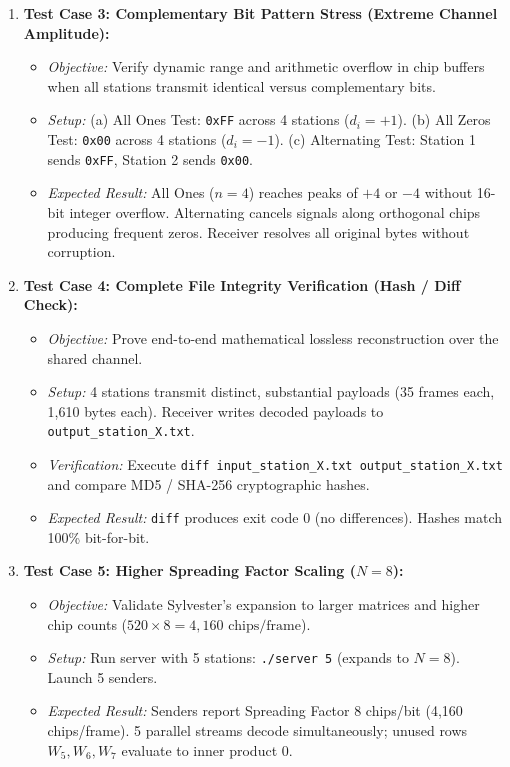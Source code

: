 \documentclass[11pt,a4paper]{article}
\begin{document}
\begin{enumerate}
    \item \textbf{Test Case 3: Complementary Bit Pattern Stress (Extreme Channel Amplitude):}
    \begin{itemize}
        \item \textit{Objective:} Verify dynamic range and arithmetic overflow in chip buffers when all stations transmit identical versus complementary bits.
        \item \textit{Setup:} 
        (a) All Ones Test: \texttt{0xFF} across 4 stations ($d_i = +1$).
        (b) All Zeros Test: \texttt{0x00} across 4 stations ($d_i = -1$).
        (c) Alternating Test: Station 1 sends \texttt{0xFF}, Station 2 sends \texttt{0x00}.
        \item \textit{Expected Result:} All Ones ($n = 4$) reaches peaks of $+4$ or $-4$ without 16-bit integer overflow. Alternating cancels signals along orthogonal chips producing frequent zeros. Receiver resolves all original bytes without corruption.
    \end{itemize}

    \item \textbf{Test Case 4: Complete File Integrity Verification (Hash / Diff Check):}
    \begin{itemize}
        \item \textit{Objective:} Prove end-to-end mathematical lossless reconstruction over the shared channel.
        \item \textit{Setup:} 4 stations transmit distinct, substantial payloads (35 frames each, 1,610 bytes each). Receiver writes decoded payloads to \texttt{output\_station\_X.txt}.
        \item \textit{Verification:} Execute \texttt{diff input\_station\_X.txt output\_station\_X.txt} and compare MD5 / SHA-256 cryptographic hashes.
        \item \textit{Expected Result:} \texttt{diff} produces exit code 0 (no differences). Hashes match 100\% bit-for-bit.
    \end{itemize}

    \item \textbf{Test Case 5: Higher Spreading Factor Scaling ($N = 8$):}
    \begin{itemize}
        \item \textit{Objective:} Validate Sylvester's expansion to larger matrices and higher chip counts ($520 \times 8 = 4,160\text{ chips/frame}$).
        \item \textit{Setup:} Run server with 5 stations: \texttt{./server 5} (expands to $N = 8$). Launch 5 senders.
        \item \textit{Expected Result:} Senders report Spreading Factor 8 chips/bit (4,160 chips/frame). 5 parallel streams decode simultaneously; unused rows $W_5, W_6, W_7$ evaluate to inner product 0.
    \end{itemize}
\end{enumerate}
\end{document}
